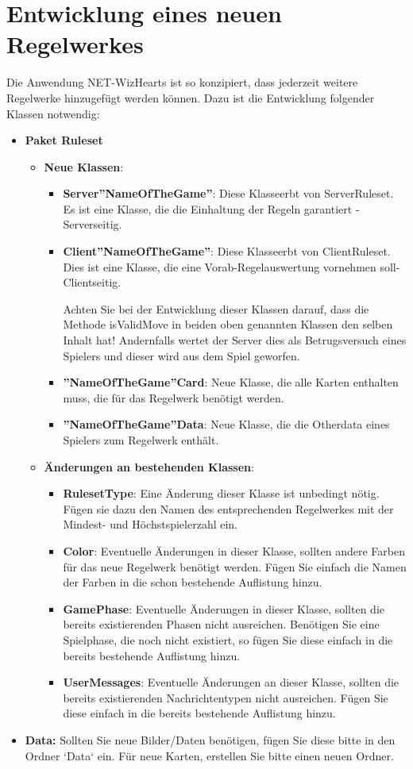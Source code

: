 \documentclass[titlepage,10pt,a4paper]{article}
\begin{document}
\section{Entwicklung eines neuen \gls{Regelwerk}es}
Die Anwendung NET-WizHearts ist so konzipiert, dass jederzeit weitere \gls{Regelwerk}e hinzugefügt werden können.
Dazu ist die Entwicklung folgender Klassen notwendig:
\begin{itemize}
\item \textbf{Paket Ruleset}
	\begin{itemize}
	\item \textbf{Neue Klassen}:
		\begin{itemize}
		\item \textbf{Server''NameOfTheGame''}: Diese Klasseerbt von ServerRuleset. Es ist eine Klasse, die die Einhaltung der Regeln garantiert - Serverseitig.
		\item \textbf{Client''NameOfTheGame''}: Diese Klasseerbt von ClientRuleset. Dies ist eine Klasse, die eine Vorab-Regelauswertung vornehmen soll- Clientseitig.
	
		 Achten Sie bei der Entwicklung dieser Klassen darauf, dass die Methode isValidMove in beiden oben genannten Klassen den selben Inhalt hat! Andernfalls wertet der Server dies als Betrugsversuch eines Spielers und dieser wird aus dem Spiel geworfen.
		 \item \textbf{''NameOfTheGame''Card}: Neue Klasse, die alle Karten enthalten muss, die für das Regelwerk benötigt werden.
		\item \textbf{''NameOfTheGame''Data}: Neue Klasse, die die Otherdata eines Spielers zum Regelwerk enthält.
	\end{itemize}
	\item \textbf{Änderungen an bestehenden Klassen}:
		\begin{itemize}
		\item \textbf{RulesetType}: Eine Änderung dieser Klasse ist unbedingt nötig. Fügen sie dazu den Namen des entsprechenden Regelwerkes mit der Mindest- und Höchstspielerzahl ein.
		\item \textbf{Color}: Eventuelle Änderungen in dieser Klasse, sollten andere Farben für das neue Regelwerk benötigt werden. Fügen Sie einfach die Namen der Farben in die schon bestehende Auflistung hinzu.
		\item \textbf{GamePhase}: Eventuelle Änderungen in dieser Klasse, sollten die bereits existierenden Phasen nicht ausreichen. Benötigen Sie eine Spielphase, die noch nicht existiert, so fügen Sie diese einfach in die bereits bestehende Auflistung hinzu.
		\item \textbf{UserMessages}: Eventuelle Änderungen an dieser Klasse, sollten die bereits existierenden Nachrichtentypen nicht ausreichen. Fügen Sie diese einfach in die bereits bestehende Auflistung hinzu.
		\end{itemize}
	\end{itemize}
\item \textbf{Data:} Sollten Sie neue Bilder/Daten benötigen, fügen Sie diese bitte in den Ordner `Data` ein. Für neue Karten, erstellen Sie bitte einen neuen Ordner.
\end{itemize}

\newpage
\printglossaries
\end{document}
